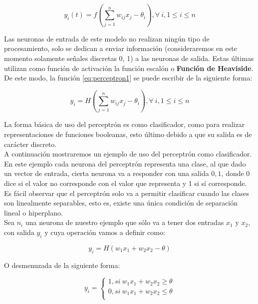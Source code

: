 \begin{equation}
  \label{eq:perceptron1}
y_i(t) = f(\sum_{j=1}^nw_{ij}x_j-\theta_i), \forall\  i, 1 \leq i \leq n
\end{equation}

Las neuronas de entrada de este modelo no realizan ningún tipo de
procesamiento, solo se dedican a enviar información (consideraremos en
este momento solamente señales discretas {0, 1}) a las neuronas de
salida. Estas últimas utilizan como función de activación la función
escalón o \textbf{Función de Heaviside}. De este modo, la función
\ref{eq:perceptron1} se puede escribir de la siguiente forma:

\begin{equation}
  y_i = H(\sum_{j=1}^nw_{ij}x_j-\theta_i), \forall\  i, 1 \leq i \leq n
\end{equation}

La forma básica de uso del perceptrón es como clasificador, como para
realizar representaciones de funciones booleanas, esto último debido a
que su salida es de carácter discreto.\\

A continuación mostraremos un ejemplo de uso del perceptrón como
clasificador. En este ejemplo cada neurona del perceptrón representa
una clase, al que dado un vector de entrada, cierta neurona va a
responder con una salida ${0,1}$, donde 0 dice si el valor no
corresponde con el valor que representa y 1 si sí corresponde. Es
fácil observar que el perceptrón solo va a permitir clasificar cuando
las clases son linealmente separables, esto es, existe una única
condición de separación lineal o hiperplano.\\

Sea $n_i$ una neurona de nuestro ejemplo que sólo va a tener dos
entradas $x_1$ y $x_2$, con salida $y_i$ y cuya operación vamos a
definir como:

\begin{equation}
  y_i = H(w_1x_1 + w_2x_2 - \theta)
\end{equation}

O desmenuzada de la siguiente forma:

\begin{equation}
  y_i  =
  \begin{cases}
    1, si\ w_1x_1 + w_2x_2 \geq \theta\\
    0, si\ w_1x_1 + w_2x_2 \le \theta\\
  \end{cases}
\end{equation}

